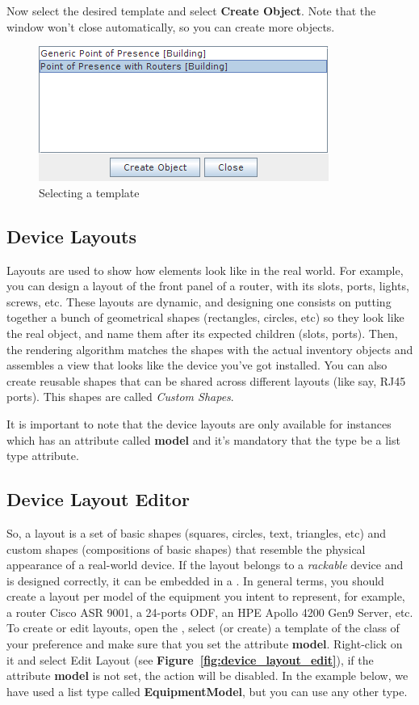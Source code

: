 \documentclass[a4paper]{article}
\begin{document}
	\newpage
	Now select the desired template and select \textbf{Create Object}. Note that the window won't close automatically, so you can create more objects.
	\begin{figure}[h!]
		\centering
		\includegraphics[width=0.5\linewidth]{img/template_manager_select_template.png}
		\caption{Selecting a template}
		\label{fig:template_manager_select_template}
	\end{figure}

	\subsection{Device Layouts} \label{sec:layouts}
	Layouts are used to show how elements look like in the real world. For example, you can design a layout of the front panel of a router, with its slots, ports, lights, screws, etc. These layouts are dynamic, and designing one consists on putting together a bunch of geometrical shapes (rectangles, circles, etc) so they look like the real object, and name them after its expected children (slots, ports). Then, the rendering algorithm matches the shapes with the actual inventory objects and assembles a view that looks like the device you've got installed. You can also create reusable shapes that can be shared across different layouts (like say, RJ45 ports). This shapes are called \textit{Custom Shapes}.
	
	It is important to note that the device layouts are only available for instances which has an attribute called \textbf{model} and it's mandatory that the type be a list type attribute.
		
	\subsection{Device Layout Editor} \label{sec:device_layout_editor}
	So, a layout is a set of basic shapes (squares, circles, text, triangles, etc) and custom shapes (compositions of basic shapes) that resemble the physical appearance of a real-world device. If the layout belongs to a \textit{rackable} device and is designed correctly, it can be embedded in a \textbf{}. In general terms, you should create a layout per model of the equipment you intent to represent, for example, a router Cisco ASR 9001, a 24-ports ODF, an HPE Apollo 4200 Gen9 Server, etc.
	\\
	To create or edit layouts, open the \textbf{}, select (or create) a template of the class of your preference and make sure that you set the attribute \textbf{model}. Right-click on it and select Edit Layout (see  \textbf{Figure~\ref{fig:device_layout_edit}}), if the attribute \textbf{model} is not set, the action will be disabled. In the example below, we have used a list type called \textbf{EquipmentModel}, but you can use any other type.
    
\end{document}
